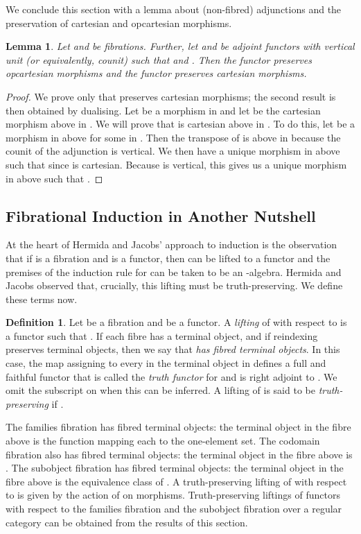 \documentclass{LMCS}
\theoremstyle{plain}
\newtheorem{lemma}[theorem]{Lemma}
\theoremstyle{remark}
\theoremstyle{definition}
\newtheorem{definition}[theorem]{Definition}
\begin{document}
We conclude this section with a lemma about (non-fibred) adjunctions
and the preservation of cartesian and opcartesian morphisms.
\begin{lemma}\label{lem:adjandcart}
  Let  and  be fibrations. Further, let
   and  be adjoint functors  with
  vertical unit (or equivalently, counit) such that 
  and . Then the functor  preserves opcartesian
  morphisms and the functor  preserves cartesian morphisms.
\end{lemma}
\begin{proof}
  We prove only that  preserves cartesian morphisms; the second
  result is then obtained by dualising. Let  be a morphism
  in  and let  be the cartesian morphism above  in
  . We will prove that  is cartesian above  in . To
  do this, let  be a morphism in  above  for some
   in . Then the transpose  of  is above  in  because the counit  of the adjunction  is vertical. We then have a unique morphism  in
   above  such that  since  is
  cartesian. Because  is vertical, this gives us a unique
  morphism  in  above  such that .
\end{proof}

\subsection{Fibrational Induction in Another Nutshell}

At the heart of Hermida and Jacobs' approach to induction is the
observation that if  is a fibration and  is
a functor, then  can be lifted to a functor  and
the premises of the induction rule for  can be taken to be an
-algebra. Hermida and Jacobs observed that, crucially, this
lifting must be truth-preserving. We define these terms now.

\begin{definition}\label{def:multi}
  Let  be a fibration and  be a
  functor.  A {\em lifting} of  with respect to  is a functor
   such that .  If each
  fibre  has a terminal object, and if reindexing preserves
  terminal objects, then we say that  {\em has fibred terminal
    objects}. In this case, the map assigning to every  in  the
  terminal object in  defines a full and faithful functor 
  that is called the {\em truth functor} for  and is right adjoint
  to . We omit the subscript on  when this can be inferred. A
  lifting  of  is said to be {\em truth-preserving} if .
\end{definition}

The families fibration has fibred terminal objects: the terminal
object in the fibre above  is the function mapping each 
to the one-element set. The codomain fibration  also has
fibred terminal objects: the terminal object in the fibre above  is
. The subobject fibration has fibred terminal objects:
the terminal object in the fibre above  is the equivalence class of
.  A truth-preserving lifting  of  with
respect to  is given by the action of  on morphisms.
Truth-preserving liftings of functors with respect to the families
fibration and the subobject fibration over a regular category can be
obtained from the results of this section.
\end{document}
